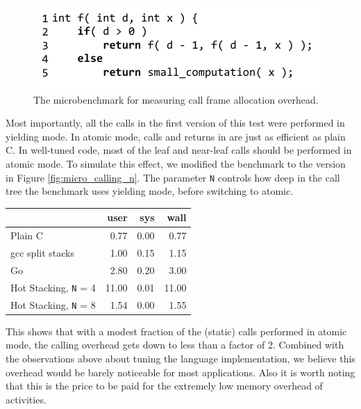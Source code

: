 \documentclass[acmsmall,anonymous,review]{acmart}\settopmatter{printfolios=true,printccs=false,printacmref=false}
\begin{document}
\begin{figure}
\includegraphics{Code/just_calling_benchmark}
\caption{The microbenchmark for measuring call frame allocation overhead.}
\label{fig:micro_calling}
\end{figure}

Most importantly, all the calls in the first version of this test were performed in yielding mode.
In atomic mode, calls and returns in \charcoal{} are just as efficient as plain C.
In well-tuned \charcoal{} code, most of the leaf and near-leaf calls should be performed in atomic mode.
To simulate this effect, we modified the benchmark to the version in Figure \ref{fig:micro_calling_n}.
The parameter \texttt{N} controls how deep in the call tree the benchmark uses yielding mode, before switching to atomic.

\vspace{1em}
\begin{tabular}{|l|r|r|r|}
  \hline
   & user & sys & wall \\
  \hline
  \hline
  Plain C & 0.77 & 0.00 & 0.77 \\
  \hline
  gcc split stacks\footnotemark{} & 1.00 & 0.15 & 1.15 \\
  \hline
  Go & 2.80 & 0.20 & 3.00 \\
  \hline
  Hot Stacking, \texttt{N} = 4 & 11.00 & 0.01 & 11.00 \\
  \hline
  Hot Stacking, \texttt{N} = 8 & 1.54 & 0.00 & 1.55 \\
  \hline
\end{tabular}
\vspace{1em}


This shows that with a modest fraction of the (static) calls performed in atomic mode, the calling overhead gets down to less than a factor of 2.
Combined with the observations above about tuning the language implementation, we believe this overhead would be barely noticeable for most applications.
Also it is worth noting that this is the price to be paid for the extremely low memory overhead of activities.
\end{document}
